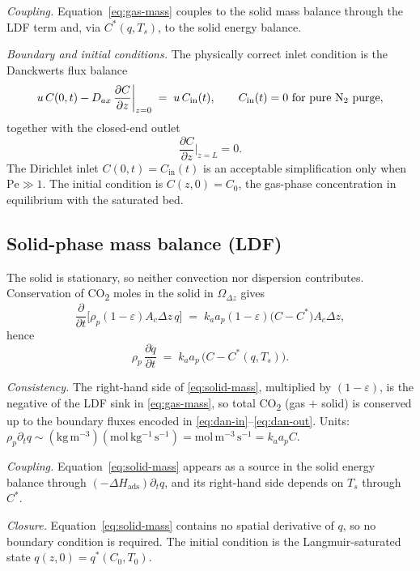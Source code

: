 \documentclass[a4paper,11pt]{amsart}
\theoremstyle{definition}
\begin{document}
\emph{Coupling.} Equation~\eqref{eq:gas-mass} couples to the solid mass balance through the LDF term and, via $C^\ast(q,T_s)$, to the solid energy balance.

\emph{Boundary and initial conditions.} The physically correct inlet condition is the Danckwerts flux balance
\begin{equation}\label{eq:dan-in}
u\,C(0,t) - D_{ax}\,\frac{\partial C}{\partial z}\bigg|_{z=0} \;=\; u\,C_{\text{in}}(t),
\qquad C_{\text{in}}(t)=0\ \text{for pure N\textsubscript{2} purge},
\end{equation}
together with the closed-end outlet
\begin{equation}\label{eq:dan-out}
\frac{\partial C}{\partial z}\bigg|_{z=L}=0.
\end{equation}
The Dirichlet inlet $C(0,t)=C_{\text{in}}(t)$ is an acceptable simplification only when $\mathrm{Pe}\gg 1$. The initial condition is $C(z,0)=C_0$, the gas-phase concentration in equilibrium with the saturated bed.

\subsection{Solid-phase mass balance (LDF)}\label{sec:solid-mass}

The solid is stationary, so neither convection nor dispersion contributes. Conservation of CO\textsubscript{2} moles in the solid in $\Omega_{\Delta z}$ gives
\[
\frac{\partial}{\partial t}\bigl[\rho_p(1-\varepsilon)A_c\Delta z\,q\bigr]
\;=\; k_a a_p(1-\varepsilon)\bigl(C-C^\ast\bigr)A_c\Delta z,
\]
hence
\begin{equation}\label{eq:solid-mass}
\rho_p\,\frac{\partial q}{\partial t} \;=\; k_a a_p\,\bigl(C-C^\ast(q,T_s)\bigr).
\end{equation}

\emph{Consistency.} The right-hand side of \eqref{eq:solid-mass}, multiplied by $(1-\varepsilon)$, is the negative of the LDF sink in \eqref{eq:gas-mass}, so total CO\textsubscript{2} (gas $+$ solid) is conserved up to the boundary fluxes encoded in \eqref{eq:dan-in}--\eqref{eq:dan-out}. Units: $\rho_p\partial_t q\sim (\mathrm{kg\,m^{-3}})(\mathrm{mol\,kg^{-1}\,s^{-1}})=\mathrm{mol\,m^{-3}\,s^{-1}}=k_a a_p C$.

\emph{Coupling.} Equation~\eqref{eq:solid-mass} appears as a source in the solid energy balance through $(-\Delta H_{\text{ads}})\partial_t q$, and its right-hand side depends on $T_s$ through $C^\ast$.

\emph{Closure.} Equation~\eqref{eq:solid-mass} contains no spatial derivative of $q$, so no boundary condition is required. The initial condition is the Langmuir-saturated state $q(z,0)=q^\ast(C_0,T_0)$.
\end{document}
